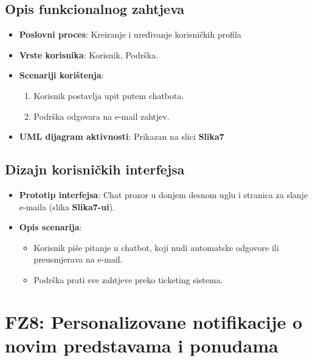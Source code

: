 \subsection{Opis funkcionalnog zahtjeva}  
\begin{itemize}  
    \item \textbf{Poslovni proces}: Kreiranje i uređivanje korisničkih profila   
    \item \textbf{Vrste korisnika}: Korisnik, Podrška.  
    \item \textbf{Scenariji korištenja}:  
        \begin{enumerate}  
            \item Korisnik postavlja upit putem chatbota.  
            \item Podrška odgovara na e-mail zahtjev.  
        \end{enumerate}  
    \item \textbf{UML dijagram aktivnosti}: Prikazan na slici \textbf{Slika7}  
\end{itemize}  

\sloppy  
\subsection{Dizajn korisničkih interfejsa}  
\begin{itemize}  
    \item \textbf{Prototip interfejsa}: Chat prozor u donjem desnom uglu i stranica za slanje e-maila (slika \textbf{Slika7-ui}).  
    \item \textbf{Opis scenarija}:  
        \begin{itemize}  
            \item Korisnik piše pitanje u chatbot, koji nudi automatske odgovore ili preusmjerava na e-mail.  
            \item Podrška prati sve zahtjeve preko ticketing sistema.  
        \end{itemize}  
\end{itemize}  

\sloppy  
\section{FZ8: Personalizovane notifikacije o novim predstavama i ponudama}  

\sloppy  
